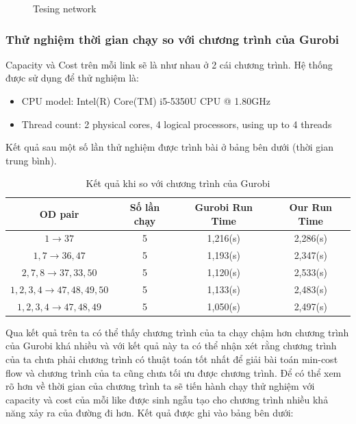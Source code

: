\documentclass[a4paper]{article}
\begin{document}
\begin{figure}[h]
	\caption{Tesing network}
\end{figure}
    

\subsubsection{Thử nghiệm thời gian chạy so với chương trình của Gurobi} 
Capacity và Cost trên mỗi link sẽ là như nhau ở 2 cái chương trình. Hệ thống được sử dụng để thử nghiệm là: 
\begin{itemize}
\item CPU model: Intel(R) Core(TM) i5-5350U CPU @ 1.80GHz
\item Thread count: 2 physical cores, 4 logical processors, using up to 4 threads
\end{itemize}
Kết quả sau một số lần thử nghiệm được trình bài ở bảng bên dưới (thời gian trung bình).
\begin{center}
\begin{table}[h!]
  \centering
  \caption{Kết quả khi so với chương trình của Gurobi}
  \begin{tabular}{cccc}
    \hline
    OD pair & Số lần chạy & Gurobi Run Time & Our Run Time \\
    \hline
    $1\rightarrow 37$ & 5 & 1,216(s) & 2,286(s)\\
    $1,7 \rightarrow 36, 47$& 5 & 1,193(s) & 2,347(s)\\
    $2,7,8\rightarrow 37,33,50$ & 5 & 1,120(s) & 2,533(s)\\
    $1,2,3,4 \rightarrow 47,48,49,50$& 5 & 1,133(s) & 2,483(s)\\
    $1,2,3,4 \rightarrow 47,48,49$& 5 & 1,050(s) & 2,497(s)\\
    \hline
  \end{tabular}
\end{table}
\end{center}
Qua kết quả trên ta có thể thấy chương trình của ta chạy chậm hơn chương trình của Gurobi khá nhiều và với kết quả này ta có thể nhận xét rằng chương trình của ta chưa phải chương trình có thuật toán tốt nhất để giải bài toán min-cost flow và chương trình của ta cũng chưa tối ưu được chương trình. Để có thể xem rõ hơn về thời gian của chương trình ta sẽ tiến hành chạy thử nghiệm với capacity và cost của mỗi like được sinh ngẫu tạo cho chương trình nhiều khả năng xảy ra của đường đi hơn. Kết quả được ghi vào bảng bên dưới:
\end{document}
